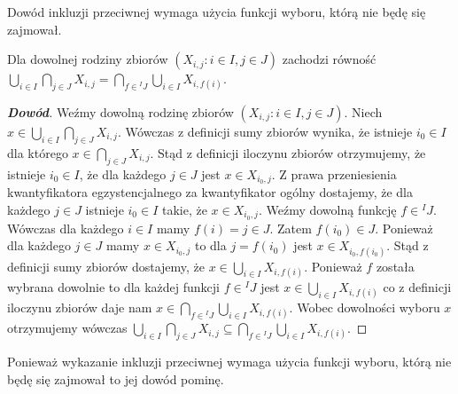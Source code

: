 \begin{remark}
Dowód inkluzji przeciwnej wymaga użycia funkcji wyboru, którą nie będę się zajmował.
\end{remark}
\begin{property}
Dla dowolnej rodziny zbiorów $(X_{i,j}:i\in I,j\in J)$ zachodzi równość $\bigcup\limits_{i\in I}\bigcap\limits_{j\in J}X_{i,j}=\bigcap\limits_{f\in{}^{I}J}\bigcup\limits_{i\in I}X_{i,f(i)}$.
\end{property}
\begin{proof}[\textbf{Dowód}]
Weźmy dowolną rodzinę zbiorów $(X_{i,j}:i\in I,j\in J)$. Niech $x\in\bigcup\limits_{i\in I}\bigcap\limits_{j\in J}X_{i,j}$. Wówczas z definicji sumy zbiorów wynika, że istnieje $i_{0}\in I$ dla którego $x\in\bigcap\limits_{j\in J}X_{i,j}$. Stąd z definicji iloczynu zbiorów otrzymujemy, że istnieje $i_{0}\in I$, że dla każdego $j\in J$ jest $x\in X_{i_{0},j}$. Z prawa przeniesienia kwantyfikatora egzystencjalnego za kwantyfikator ogólny dostajemy, że dla każdego $j\in J$ istnieje $i_{0}\in I$ takie, że $x\in X_{i_{0},j}$. Weźmy dowolną funkcję $f\in{}^{I}J$. Wówczas dla każdego $i\in I$ mamy $f(i)=j\in J$. Zatem $f(i_{0})\in J$. Ponieważ dla każdego $j\in J$ mamy $x\in X_{i_{0},j}$ to dla $j=f(i_{0})$ jest $x\in X_{i_{0},f(i_{0})}$. Stąd z definicji sumy zbiorów dostajemy, że $x\in\bigcup\limits_{i\in I}X_{i,f(i)}$. Ponieważ $f$ została wybrana dowolnie to dla każdej funkcji $f\in{}^{I}J$ jest $x\in\bigcup\limits_{i\in I}X_{i,f(i)}$ co z definicji iloczynu zbiorów daje nam $x\in\bigcap\limits_{f\in{}^{I}J}\bigcup\limits_{i\in I}X_{i,f(i)}$. Wobec dowolności wyboru $x$ otrzymujemy wówczas $\bigcup\limits_{i\in I}\bigcap\limits_{j\in J}X_{i,j}\subseteq\bigcap\limits_{f\in{}^{I}J}\bigcup\limits_{i\in I}X_{i,f(i)}$.
\end{proof}
\begin{remark}
Ponieważ wykazanie inkluzji przeciwnej wymaga użycia funkcji wyboru, którą nie będę się zajmował to jej dowód pominę.
\end{remark}

